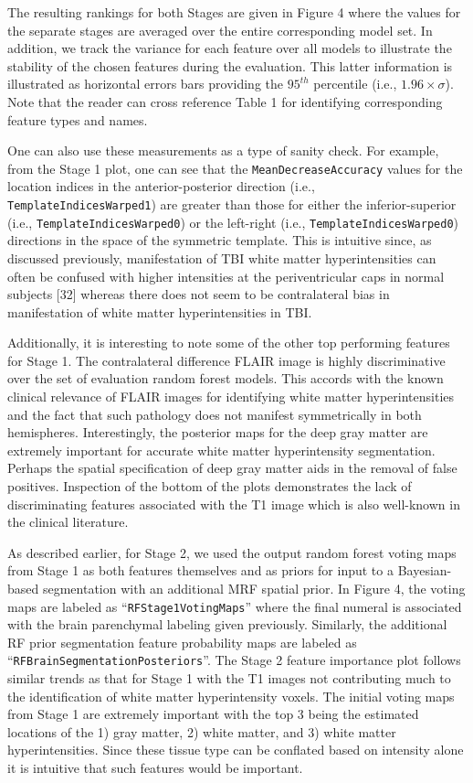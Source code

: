 \documentclass[11pt,]{article}
\begin{document}
The resulting rankings for both Stages are given in Figure 4 where the
values for the separate stages are averaged over the entire
corresponding model set. In addition, we track the variance for each
feature over all models to illustrate the stability of the chosen
features during the evaluation. This latter information is illustrated
as horizontal errors bars providing the \(95^{th}\) percentile (i.e.,
\(1.96 \times \sigma\)). Note that the reader can cross reference Table
1 for identifying corresponding feature types and names.

One can also use these measurements as a type of sanity check. For
example, from the Stage 1 plot, one can see that the
\texttt{MeanDecreaseAccuracy} values for the location indices in the
anterior-posterior direction (i.e., \texttt{TemplateIndicesWarped1}) are
greater than those for either the inferior-superior (i.e.,
\texttt{TemplateIndicesWarped0}) or the left-right (i.e.,
\texttt{TemplateIndicesWarped0}) directions in the space of the
symmetric template. This is intuitive since, as discussed previously,
manifestation of TBI white matter hyperintensities can often be confused
with higher intensities at the periventricular caps in normal subjects
{[}32{]} whereas there does not seem to be contralateral bias in
manifestation of white matter hyperintensities in TBI.

Additionally, it is interesting to note some of the other top performing
features for Stage 1. The contralateral difference FLAIR image is highly
discriminative over the set of evaluation random forest models. This
accords with the known clinical relevance of FLAIR images for
identifying white matter hyperintensities and the fact that such
pathology does not manifest symmetrically in both hemispheres.
Interestingly, the posterior maps for the deep gray matter are extremely
important for accurate white matter hyperintensity segmentation. Perhaps
the spatial specification of deep gray matter aids in the removal of
false positives. Inspection of the bottom of the plots demonstrates the
lack of discriminating features associated with the T1 image which is
also well-known in the clinical literature.

As described earlier, for Stage 2, we used the output random forest
voting maps from Stage 1 as both features themselves and as priors for
input to a Bayesian-based segmentation with an additional MRF spatial
prior. In Figure 4, the voting maps are labeled as
``\texttt{RFStage1VotingMaps}'' where the final numeral is associated
with the brain parenchymal labeling given previously. Similarly, the
additional RF prior segmentation feature probability maps are labeled as
``\texttt{RFBrainSegmentationPosteriors}''. The Stage 2 feature
importance plot follows similar trends as that for Stage 1 with the T1
images not contributing much to the identification of white matter
hyperintensity voxels. The initial voting maps from Stage 1 are
extremely important with the top 3 being the estimated locations of the
1) gray matter, 2) white matter, and 3) white matter hyperintensities.
Since these tissue type can be conflated based on intensity alone it is
intuitive that such features would be important.
\end{document}
